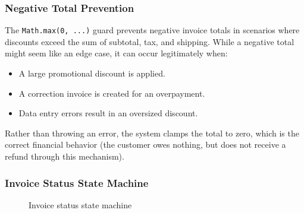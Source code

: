 \documentclass[12pt,onecolumn]{IEEEtran}
\begin{document}
\subsubsection{Negative Total Prevention}

The \texttt{Math.max(0, ...)} guard prevents negative invoice totals in scenarios where discounts exceed the sum of subtotal, tax, and shipping. While a negative total might seem like an edge case, it can occur legitimately when:
\begin{itemize}[leftmargin=1.5em]
  \item A large promotional discount is applied.
  \item A correction invoice is created for an overpayment.
  \item Data entry errors result in an oversized discount.
\end{itemize}

Rather than throwing an error, the system clamps the total to zero, which is the correct financial behavior (the customer owes nothing, but does not receive a refund through this mechanism).

\subsubsection{Invoice Status State Machine}

\begin{figure}[h!]
\centering
{}
\caption{Invoice status state machine}
\end{figure}
\end{document}
